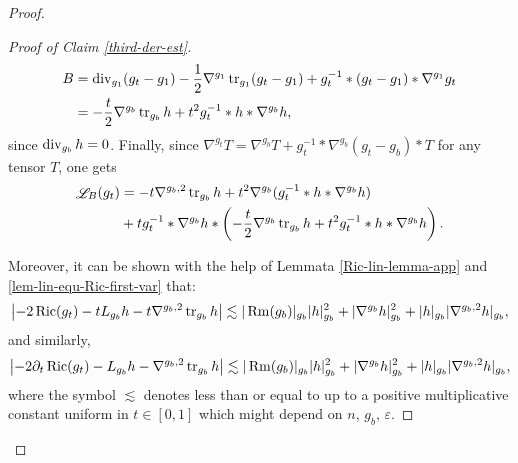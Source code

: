 \documentclass[a4paper,11pt,reqno]{amsart}
\def\Ric{\mathop{\rm Ric}\nolimits}
\def\Rm{\mathop{\rm Rm}\nolimits}
\def\tr{\mathop{\rm tr}\nolimits}
\def\div{\mathop{\rm div}\nolimits}
\def\Li{\mathop{\rm \mathscr{L}}\nolimits}
\def\Ric{\mathop{\rm Ric}\nolimits}
\def\Rm{\mathop{\rm Rm}\nolimits}
\def\tr{\mathop{\rm tr}\nolimits}
\def\div{\mathop{\rm div}\nolimits}
\def\Li{\mathop{\rm \mathscr{L}}\nolimits}
\numberwithin{equation}{section}
\begin{document}
\begin{proof}
\begin{proof}[Proof of Claim \ref{third-der-est}]
			\begin{equation*}
			\begin{split}
			B&=\div_{g_1}(g_t-g_1)-\frac{1}{2}\nabla^{g_1}\tr_{g_1}(g_t-g_1)+g_t^{-1}\ast(g_t-g_1)\ast\nabla^{g_1}g_t\\
			&=-\frac{t}{2}\nabla^{g_b}\tr_{g_b}h+t^2g_t^{-1}\ast h\ast\nabla^{g_b}h,
			\end{split}
			\end{equation*}
			since $\div_{g_b}h=0$. Finally, since $\nabla^{g_t}T=\nabla^{g_b}T+g_t^{-1}\ast \nabla^{g_b}(g_t-g_b)\ast T$ for any tensor $T$, one gets 
			\begin{equation}
			\begin{split}
			\Li_B(g_t)&=-t\nabla^{g_b,2}\tr_{g_b}h+t^2\nabla^{g_b}(g_t^{-1}\ast h\ast\nabla^{g_b}h)\\
			&+tg_t^{-1}\ast \nabla^{g_b}h\ast \left(-\frac{t}{2}\nabla^{g_b}\tr_{g_b}h+t^2g_t^{-1}\ast h\ast\nabla^{g_b}h\right).\label{lie-der-gauge-bianchi}
			\end{split}
			\end{equation}
			
			Moreover, it can be shown with the help of Lemmata \ref{Ric-lin-lemma-app} and \ref{lem-lin-equ-Ric-first-var} that:
			\begin{equation}
			\left|-2\Ric(g_t)-tL_{g_b}h-t\nabla^{g_b,2}\tr_{g_b}h\right|\lesssim |\Rm(g_b)|_{g_b}|h|^2_{g_b}+|\nabla^{g_b}h|^2_{g_b}+|h|_{g_b}|\nabla^{g_b,2}h|_{g_b},
			\end{equation}
			and similarly, 
			\begin{equation}
			\left|-2\partial_t\Ric(g_t)-L_{g_b}h-\nabla^{g_b,2}\tr_{g_b}h\right|\lesssim |\Rm(g_b)|_{g_b}|h|^2_{g_b}+|\nabla^{g_b}h|^2_{g_b}+|h|_{g_b}|\nabla^{g_b,2}h|_{g_b},
			\end{equation}
			where the symbol $\lesssim$ denotes less than or equal to up to a positive multiplicative constant uniform in $t\in[0,1]$ which might depend on $n$, $g_b$, $\varepsilon$.
			

\end{proof}
\end{proof}
\end{document}
